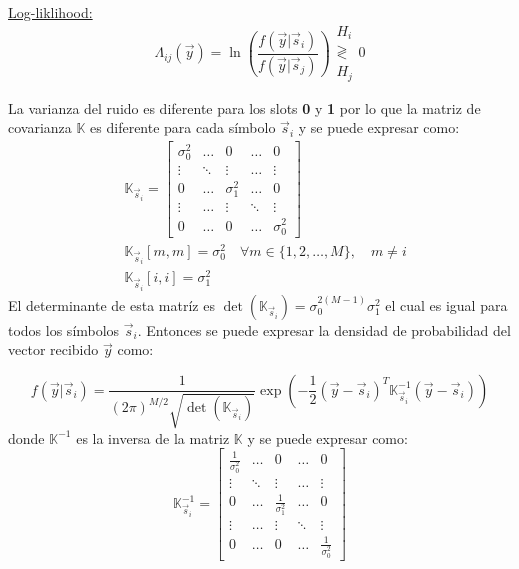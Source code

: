 \documentclass{article}
\begin{document}
    \underline{Log-liklihood:}
    \begin{equation}
        \Lambda_{ij}(\vec{y}) = \ln \left( \frac{f(\vec{y}|\vec{s}_i)}{f(\vec{y}|\vec{s}_j)} \right) 
        \begin{array}{c}
            H_i \\
            \gtrless \\
            H_j
        \end{array}
        0 \label{log-liklihood}
    \end{equation}

    La varianza del ruido es diferente para los slots \textbf{0} y \textbf{1} por lo que
    la matriz de covarianza $\mathbb{K}$ es diferente para cada símbolo $\vec{s}_i$ y se puede expresar como:
    \begin{align}
        &\mathbb{K}_{\vec{s}_i} = 
        \begin{bmatrix}
            \sigma_{0}^2 & \dots & 0 & \dots & 0 \\
            \vdots & \ddots & \vdots & \dots & \vdots \\
            0 & \dots & \sigma_1^2 & \dots & 0 \\
            \vdots & \dots & \vdots & \ddots & \vdots \\
            0 & \dots & 0 & \dots & \sigma_{0}^2
        \end{bmatrix} \nonumber\\
        &\mathbb{K}_{\vec{s}_i}[m,m] = \sigma_0^2 \quad \forall m\in\{1,2,\dots,M\}, \quad m\neq i \nonumber\\ 
        &\mathbb{K}_{\vec{s}_i}[i,i] = \sigma_1^2
    \end{align}
    El determinante de esta matríz es $\det(\mathbb{K}_{\vec{s}_i}) = \sigma_0^{2(M-1)}\sigma_1^2$
    el cual es igual para todos los símbolos $\vec{s}_i$. Entonces se puede expresar la densidad de probabilidad del vector recibido $\vec{y}$ como:

    \begin{equation}
        f(\vec{y}|\vec{s}_i) = \frac{1}{(2\pi)^{M/2}\sqrt{\det(\mathbb{K}_{\vec{s}_i})}}\exp\left( -\frac{1}{2}(\vec{y}-\vec{s}_i)^T\mathbb{K}_{\vec{s}_i}^{-1}(\vec{y}-\vec{s}_i) \right)
    \end{equation}
    donde $\mathbb{K}^{-1}$ es la inversa de la matriz $\mathbb{K}$ y se puede expresar como:
    \begin{equation}
        \mathbb{K}_{\vec{s}_i}^{-1} = 
        \begin{bmatrix}
            \frac{1}{\sigma_0^2} & \dots & 0 & \dots & 0 \\
            \vdots & \ddots & \vdots & \dots & \vdots \\
            0 & \dots & \frac{1}{\sigma_1^2} & \dots & 0 \\
            \vdots & \dots & \vdots & \ddots & \vdots \\
            0 & \dots & 0 & \dots & \frac{1}{\sigma_{0}^2}
        \end{bmatrix}
    \end{equation}
\end{document}
